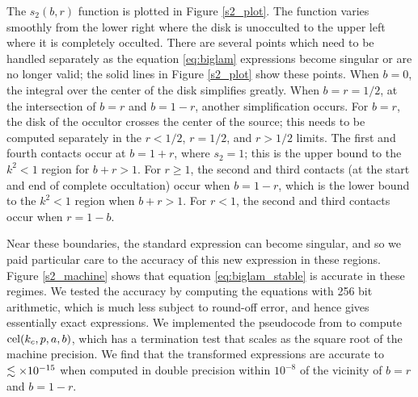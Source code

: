 \documentclass[modern]{aastex61}
\begin{document}
The $s_2(b,r)$ function is plotted in Figure \ref{s2_plot}.  The
function varies smoothly from the lower right where the disk is
unocculted to the upper left where it is completely occulted.
There are several points which need to be handled separately as
the equation \ref{eq:biglam} expressions become singular or are
no longer valid;  the solid lines in Figure \ref{s2_plot} show
these points.  When $b=0$, the integral over the center of the
disk simplifies greatly.  When $b=r=1/2$, at the intersection of
$b=r$ and $b=1-r$, another simplification occurs.  For $b=r$,
the disk of the occultor crosses the center of the source;
this needs to be computed separately in the $r<1/2$, $r=1/2$,
and $r>1/2$ limits.  The first and fourth contacts occur at
$b=1+r$, where $s_2=1$;  this is the upper bound to the $k^2 < 1$
region for $b+r >1$.
For $r \ge 1$, the second and third contacts (at the start and
end of complete occultation) occur when $b=1-r$, which is the
lower  bound to the $k^2<1$ region when $b+r >1$.
For $r < 1$, the second and third contacts occur when $r=1-b$.

Near these boundaries, the standard \citet{MandelAgol2002} expression
can become singular, and so we paid particular care to the accuracy of this
new expression in these regions.  Figure \ref{s2_machine} shows
that equation \ref{eq:biglam_stable} is accurate in these regimes.
We tested the accuracy by computing the equations with 256 bit
arithmetic, which is much less subject to round-off error, and
hence gives essentially exact expressions.  We implemented the
pseudocode from \citet{Bulirsch1969} to compute ${\rm cel}(k_c,p,a,b)$,
which has a termination test that scales as the square root of
the machine precision.  We find that the transformed expressions
are accurate to $\lesssim \times 10^{-15}$ when computed in double precision
within $10^{-8}$ of the vicinity of $b=r$ and $b=1-r$.
\end{document}
